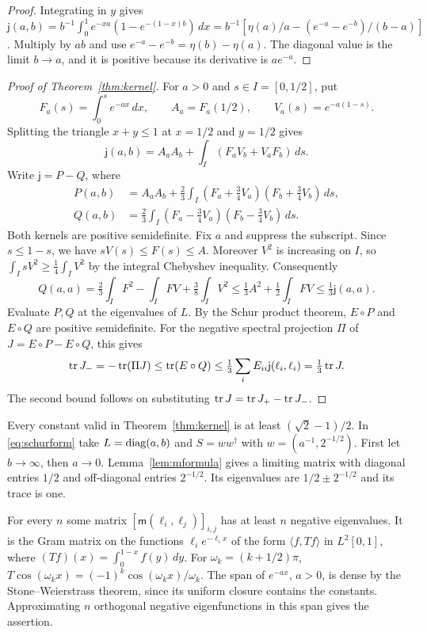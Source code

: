 \begin{proof}
Integrating in $y$ gives
$\mathsf j(a,b)=b^{-1}\int_0^1e^{-xa}(1-e^{-(1-x)b})\,dx
=b^{-1}[\eta(a)/a-(e^{-a}-e^{-b})/(b-a)]$. Multiply by $ab$ and use
$e^{-a}-e^{-b}=\eta(b)-\eta(a)$. The diagonal value is the limit $b\to a$,
and it is positive because its derivative is $ae^{-a}$.
\end{proof}


\begin{proof}[Proof of Theorem~\ref{thm:kernel}]
For $a>0$ and $s\in I=[0,1/2]$, put
\[
 F_a(s)=\int_0^s e^{-ax}\,dx,\qquad A_a=F_a(1/2),\qquad V_a(s)=e^{-a(1-s)}.
\]
Splitting the triangle $x+y\leq1$ at $x=1/2$ and $y=1/2$ gives
\[
 \mathsf j(a,b)=A_a A_b+\int_I (F_a V_b+V_a F_b)\,ds .
\]
Write $\mathsf j=P-Q$, where
\begin{align*}
 P(a,b)&=A_a A_b+\tfrac23\int_I(F_a+\tfrac34 V_a)(F_b+\tfrac34 V_b)\,ds,\\
 Q(a,b)&=\tfrac23\int_I(F_a-\tfrac34 V_a)(F_b-\tfrac34 V_b)\,ds .
\end{align*}
Both kernels are positive semidefinite. Fix $a$ and suppress the subscript.
Since $s\leq1-s$, we have $sV(s)\leq F(s)\leq A$. Moreover $V^2$ is
increasing on $I$, so $\int_I sV^2\geq\tfrac14\int_I V^2$ by the integral
Chebyshev inequality. Consequently
\[
 Q(a,a)=\tfrac23\int_I F^2-\int_I FV+\tfrac38\int_I V^2
 \leq \tfrac13 A^2+\tfrac12\int_I FV
 \leq \tfrac13\mathsf j(a,a).
\]
Evaluate $P,Q$ at the eigenvalues of $L$. By the Schur product theorem,
$E\circ P$ and $E\circ Q$ are positive semidefinite. For the negative
spectral projection $\Pi$ of $J=E\circ P-E\circ Q$, this gives
\[
 \operatorname{tr} J_-=-\operatorname{tr}(\Pi J)\leq\operatorname{tr}(E\circ Q)
 \leq\tfrac13\sum_i E_{ii}\mathsf j(\ell_i,\ell_i)=\tfrac13\operatorname{tr} J .
\]
The second bound follows on substituting $\operatorname{tr} J=\operatorname{tr} J_+-\operatorname{tr} J_-$.
\end{proof}

\begin{remark}\label{rem:constant}
Every constant valid in Theorem~\ref{thm:kernel} is at least $(\sqrt2-1)/2$.
In \eqref{eq:schurform} take $L=\operatorname{diag}(a,b)$ and $S=ww^\dagger$ with
$w=(a^{-1},2^{-1/2})$. First let $b\to\infty$, then $a\to0$.
Lemma~\ref{lem:mformula} gives a limiting matrix with diagonal entries
$1/2$ and off-diagonal entries $2^{-1/2}$. Its eigenvalues are
$1/2\pm2^{-1/2}$ and its trace is one.
\end{remark}

\begin{remark}\label{rem:indefinite}
For every $n$ some matrix $[\mathsf m(\ell_i,\ell_j)]_{i,j}$ has at least
$n$ negative eigenvalues. It is the Gram matrix on the functions
$\ell_i e^{-\ell_i x}$ of the form $\langle f,Tf\rangle$ in $L^2[0,1]$,
where $(Tf)(x)=\int_0^{1-x}f(y)\,dy$. For $\omega_k=(k+1/2)\pi$,
$T\cos(\omega_k x)=(-1)^k\cos(\omega_k x)/\omega_k$. The span of
$e^{-ax}$, $a>0$, is dense by the Stone--Weierstrass theorem, since
its uniform closure contains the constants. Approximating $n$ orthogonal
negative eigenfunctions in this span gives the assertion.
\end{remark}
